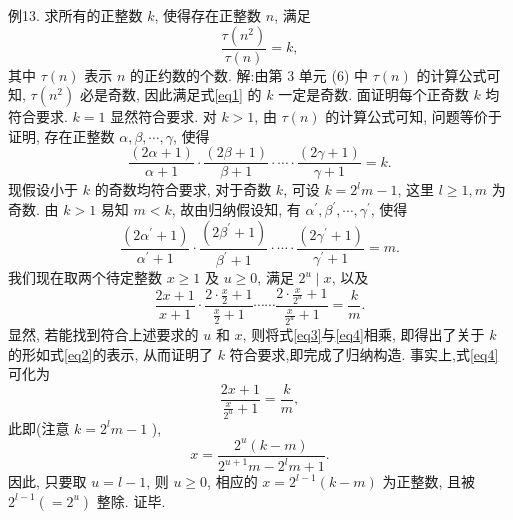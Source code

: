 例13. 求所有的正整数 $k$, 使得存在正整数 $n$, 满足
$$
\frac{\tau\left(n^2\right)}{\tau(n)}=k, \label{eq1}
$$
其中 $\tau(n)$ 表示 $n$ 的正约数的个数.
解:由第 3 单元 (6) 中 $\tau(n)$ 的计算公式可知, $\tau\left(n^2\right)$ 必是奇数, 因此满足式\ref{eq1} 的 $k$ 一定是奇数.
面证明每个正奇数 $k$ 均符合要求.
$k=1$ 显然符合要求.
对 $k>1$, 由 $\tau(n)$ 的计算公式可知, 问题等价于证明, 存在正整数 $\alpha, \beta, \cdots, \gamma$, 使得
$$
\frac{(2 \alpha+1)}{\alpha+1} \cdot \frac{(2 \beta+1)}{\beta+1} \cdot \cdots \cdot \frac{(2 \gamma+1)}{\gamma+1}=k . \label{eq2}
$$
现假设小于 $k$ 的奇数均符合要求, 对于奇数 $k$, 可设 $k=2^l m-1$, 这里 $l \geqslant 1, m$ 为奇数.
由 $k>1$ 易知 $m<k$, 故由归纳假设知, 有 $\alpha^{\prime}, \beta^{\prime}, \cdots, \gamma^{\prime}$, 使得
$$
\frac{\left(2 \alpha^{\prime}+1\right)}{\alpha^{\prime}+1} \cdot \frac{\left(2 \beta^{\prime}+1\right)}{\beta^{\prime}+1} \cdot \cdots \cdot \frac{\left(2 \gamma^{\prime}+1\right)}{\gamma^{\prime}+1}=m . \label{eq3}
$$
我们现在取两个待定整数 $x \geqslant 1$ 及 $u \geqslant 0$, 满足 $2^u \mid x$, 以及
$$
\frac{2 x+1}{x+1} \cdot \frac{2 \cdot \frac{x}{2}+1}{\frac{x}{2}+1} \cdots \cdots \frac{2 \cdot \frac{x}{2^u}+1}{\frac{x}{2^u}+1}=\frac{k}{m} . \label{eq4}
$$
显然, 若能找到符合上述要求的 $u$ 和 $x$, 则将式\ref{eq3}与\ref{eq4}相乘, 即得出了关于 $k$ 的形如式\ref{eq2}的表示, 从而证明了 $k$ 符合要求,即完成了归纳构造.
事实上,式\ref{eq4}可化为
$$
\frac{2 x+1}{\frac{x}{2^u}+1}=\frac{k}{m},
$$
此即(注意 $k=2^l m-1$ ),
$$
x=\frac{2^u(k-m)}{2^{u+1} m-2^l m+1} .
$$
因此, 只要取 $u=l-1$, 则 $u \geqslant 0$, 相应的 $x=2^{l-1}(k-m)$ 为正整数, 且被 $2^{l-1}\left(=2^u\right)$ 整除.
证毕.


